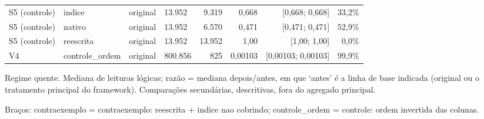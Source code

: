 {\begin{tabular}{llllrrrr}
S5 (controle) & indice & original & 13.952 & 9.319 & 0,668 & [0,668; 0,668] & 33,2\% \\
S5 (controle) & nativo & original & 13.952 & 6.570 & 0,471 & [0,471; 0,471] & 52,9\% \\
S5 (controle) & reescrita & original & 13.952 & 13.952 & 1,00 & [1,00; 1,00] & 0,0\% \\
V4 & controle\_ordem & original & 800.856 & 825 & 0,00103 & [0,00103; 0,00103] & 99,9\% \\
\bottomrule
\end{tabular}\par
\vspace{3pt}
\begin{minipage}{\linewidth}\footnotesize
Regime quente. Mediana de leituras lógicas; razão = mediana depois/antes, em que `antes' é a linha de base indicada (original ou o tratamento principal do framework). Comparações secundárias, descritivas, fora do agregado principal.\par
Braços: contraexemplo = contraexemplo: reescrita + indice nao cobrindo; controle\_ordem = controle: ordem invertida das colunas.
\end{minipage}
}
